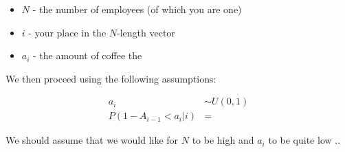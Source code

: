 \documentclass[12pt]{article}
\begin{document}
\begin{itemize}
  \item $N$ - the number of employees (of which you are one)
  \item $i$ - your place in the $N$-length vector
  \item $a_i$ - the amount of coffee the
\end{itemize}

We then proceed using the following assumptions:

$$
\begin{aligned}
a_i &\sim U(0,1)\\
P(1 - A_{i-1}  < a_i| i) &=
\end{aligned}
$$

We should assume that we would like for $N$ to be high and $a_i$ to be quite low ..
\end{document}
